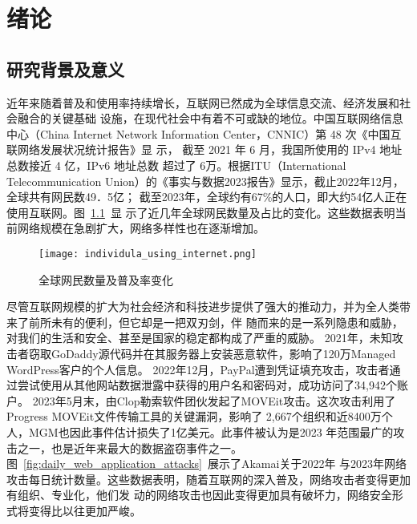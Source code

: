 \chapter{绪论}
\label{cha:overview}

\section{研究背景及意义}

近年来随着普及和使用率持续增长，互联网已然成为全球信息交流、经济发展和社会融合的关键基础
设施，在现代社会中有着不可或缺的地位。中国互联网络信息中心（China Internet 
Network Information Center，CNNIC）第 48 次《中国互联网络发展状况统计报告》显
示\cite{cnnic2021}， 截至 2021 年 6 月，我国所使用的 IPv4 地址总数接近 4 亿，IPv6 地址总数
超过了 6万。根据ITU（International Telecommunication Union）的《事实与数据2023报告》显示\cite{itu2023}，截止2022年12月，全球共有网民数49．5亿；
截至2023年，全球约有67\%的人口，即大约54亿人正在使用互联网。图~\ref{fig:individula_using_internet}~显
示了近几年全球网民数量及占比的变化。这些数据表明当前网络规模在急剧扩大，网络多样性也在逐渐增加。
\begin{figure}[htbp]
    \centering
    \texttt{[image: individula\_using\_internet.png]}
    \caption{全球网民数量及普及率变化\cite{fig-itu2023}}
    \label{fig:individula_using_internet}
  \end{figure} 


尽管互联网规模的扩大为社会经济和科技进步提供了强大的推动力，并为全人类带来了前所未有的便利，但它却是一把双刃剑，伴
随而来的是一系列隐患和威胁，对我们的生活和安全、甚至是国家的稳定都构成了严重的威胁。
2021年，未知攻击者窃取GoDaddy源代码并在其服务器上安装恶意软件，影响了120万Managed WordPress客户的个人信息。
2022年12月，PayPal遭到凭证填充攻击，攻击者通过尝试使用从其他网站数据泄露中获得的用户名和密码对，成功访问了34,942个账户。
2023年5月末，由Clop勒索软件团伙发起了MOVEit攻击。这次攻击利用了Progress MOVEit文件传输工具的关键漏洞，影响了
2,667个组织和近8400万个人，MGM也因此事件估计损失了1亿美元​。此事件被认为是2023
年范围最广的攻击之一，也是近年来最大的数据盗窃事件之一。图~\ref{fig:daily_web_application_attacks}~展示了Akamai关于2022年
与2023年网络攻击每日统计数量。这些数据表明，随着互联网的深入普及，网络攻击者变得更加有组织、专业化，他们发
动的网络攻击也因此变得更加具有破坏力，网络安全形式将变得比以往更加严峻。


